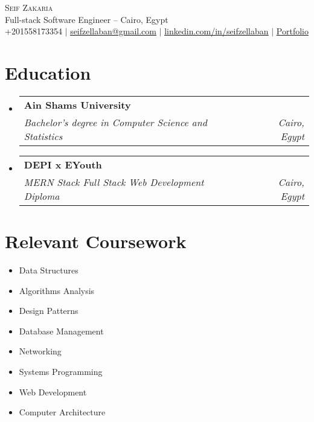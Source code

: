 \documentclass[letterpaper,11pt]{article}
\makeatletter
\newcommand{\resumeSubheading}[4]{
  \vspace{-2pt}\item
    \begin{tabular*}{1.0\textwidth}[t]{l@{\extracolsep{\fill}}r}
      \textbf{#1} & \textbf{\small #2} \\
      \textit{\small#3} & \textit{\small #4} \\
    \end{tabular*}\vspace{-7pt}
}
\newcommand{\resumeSubHeadingListStart}{\begin{itemize}[leftmargin=0.0in, label={}]}
\newcommand{\resumeSubHeadingListEnd}{\end{itemize}}
\makeatother
\begin{document}

\begin{center}
    {\Huge \scshape Seif Zakaria} \\ \vspace{1pt}
    Full-stack Software Engineer -- Cairo, Egypt \\ \vspace{1pt}
    \small +201558173354 $|$ \href{mailto:seifzellaban@gmail.com}{\underline{seifzellaban@gmail.com}} $|$ 
    \href{https://linkedin.com/in/seifzellaban}{\underline{linkedin.com/in/seifzellaban}} $|$
    \href{https://seifzellaban.work}{\underline{Portfolio}}
    \vspace{-8pt}
\end{center}


\section{Education}
  \resumeSubHeadingListStart
    \resumeSubheading
      {Ain Shams University}{}
      {Bachelor’s degree in Computer Science and Statistics}{Cairo, Egypt}
    \resumeSubheading
      {DEPI x EYouth}{}
      {MERN Stack Full Stack Web Development Diploma}{Cairo, Egypt}
  \resumeSubHeadingListEnd

\section{Relevant Coursework}
        \begin{multicols}{4}
            \begin{itemize}[itemsep=-5pt, parsep=3pt]
                \item\small Data Structures
                \item Algorithms Analysis
                \item Design Patterns
                \item Database Management
                \item Networking
                \item Systems Programming
                \item Web Development
                \item Computer Architecture
            \end{itemize}
        \end{multicols}
        \vspace*{2.0\multicolsep}
\end{document}
